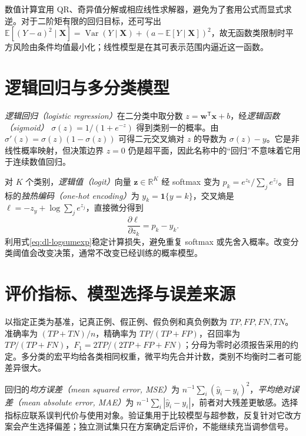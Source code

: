数值计算宜用 QR、奇异值分解或相应线性求解器，避免为了套用公式而显式求逆。对于二阶矩有限的回归目标，还可写出 $\mathbb E[(Y-a)^2\mid\mathbf X]=\operatorname{Var}(Y\mid\mathbf X)+(a-\mathbb E[Y\mid\mathbf X])^2$，故无函数类限制时平方风险由条件均值最小化；线性模型是在其可表示范围内逼近这一函数。

\section{逻辑回归与多分类模型}
\emph{逻辑回归（logistic regression）}在二分类中取分数 $z=\mathbf w^\mathsf T\mathbf x+b$，经\emph{逻辑函数（sigmoid）} $\sigma(z)=1/(1+e^{-z})$ 得到类别一的概率。由 $\sigma'(z)=\sigma(z)(1-\sigma(z))$ 可得二元交叉熵对 $z$ 的导数为 $\sigma(z)-y$。它是非线性概率映射，但决策边界 $z=0$ 仍是超平面，因此名称中的“回归”不意味着它用于连续数值回归。

对 $K$ 个类别，\emph{逻辑值（logit）}向量 $\mathbf z\in\mathbb R^K$ 经 softmax 变为 $p_k=e^{z_k}/\sum_je^{z_j}$。目标的\emph{独热编码（one-hot encoding）}为 $y_k=\mathbf1\{y=k\}$，交叉熵是 $\ell=-z_y+\log\sum_je^{z_j}$，直接微分得到
\begin{equation}
\frac{\partial\ell}{\partial z_k}=p_k-y_k.
\label{eq:dl-softmax-gradient}
\end{equation}
利用式\eqref{eq:dl-logsumexp}稳定计算损失，避免重复 softmax 或先舍入概率。改变分类阈值会改变决策，通常不改变已经训练的概率模型。

\section{评价指标、模型选择与误差来源}
以指定正类为基准，记真正例、假正例、假负例和真负例数为 $TP,FP,FN,TN$。准确率为 $(TP+TN)/n$，精确率为 $TP/(TP+FP)$，召回率为 $TP/(TP+FN)$，$F_1=2TP/(2TP+FP+FN)$；分母为零时必须报告采用的约定。多分类的宏平均给各类相同权重，微平均先合并计数，类别不均衡时二者可能差异很大。

回归的\emph{均方误差（mean squared error, MSE）}为 $n^{-1}\sum_i(\widehat y_i-y_i)^2$，\emph{平均绝对误差（mean absolute error, MAE）}为 $n^{-1}\sum_i|\widehat y_i-y_i|$，前者对大残差更敏感。选择指标应联系误判代价与使用对象。验证集用于比较模型与超参数，反复针对它改方案会产生选择偏差；独立测试集只在方案确定后评价，不能继续充当调参信号。

